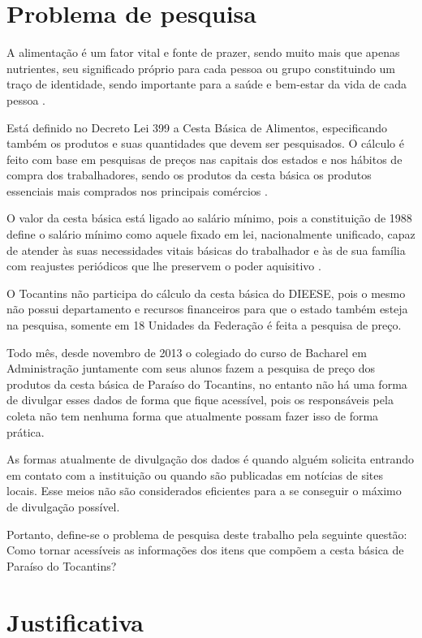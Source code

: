 \documentclass{ifto-tex}
\begin{document}
	\section{Problema de pesquisa}
	
		A alimentação é um fator vital e fonte de prazer, sendo muito mais que apenas nutrientes, seu significado próprio para cada pessoa ou grupo constituindo um traço de identidade, sendo importante para a saúde e bem-estar da vida de cada pessoa \cite{loureiro2004importancia}.

Está definido no Decreto Lei 399 a Cesta Básica de Alimentos, especificando também os produtos e suas quantidades que devem ser pesquisados. O cálculo é feito com base em pesquisas de preços nas capitais dos estados e nos hábitos de compra dos trabalhadores, sendo os produtos da cesta básica os produtos essenciais mais comprados nos principais comércios \cite{metodolo8:online}.

O valor da cesta básica está ligado ao salário mínimo, pois a constituição de 1988 define o salário mínimo como aquele fixado em lei, nacionalmente unificado, capaz de atender às suas necessidades vitais básicas do trabalhador e às de sua família com reajustes periódicos que lhe preservem o poder aquisitivo \cite{metodolo8:online}.

O Tocantins não participa do cálculo da cesta básica do DIEESE, pois o mesmo não possui departamento e recursos financeiros para que o estado também esteja na pesquisa, somente em 18 Unidades da Federação é feita a pesquisa de preço.

Todo mês, desde novembro de 2013 o colegiado do curso de Bacharel em Administração juntamente com seus alunos fazem a pesquisa de preço dos produtos da cesta básica de Paraíso do Tocantins, no entanto não há uma forma de divulgar esses dados de forma que fique acessível, pois os responsáveis pela coleta não tem nenhuma forma que atualmente possam fazer isso de forma prática.

As formas atualmente de divulgação dos dados é quando alguém solicita entrando em contato com a instituição ou quando são publicadas em notícias de sites locais. Esse meios não são considerados eficientes para a se conseguir o máximo de divulgação possível.

Portanto, define-se o problema de pesquisa deste trabalho pela seguinte questão: Como tornar acessíveis as informações dos itens que compõem a  cesta básica de Paraíso do Tocantins?
	
	\section{Justificativa}
	
\end{document}
